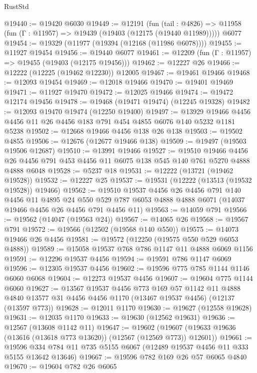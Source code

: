 \begin{lexlean}{RustStd}
\begin{coremodule}
@19440 := @19420 @6030
@19449 := @12191
    (fun (tail : @4826) => @11958 (fun (Γ : @11957) => @19439 (@19403 (@12175 (@19440 @11989)))))
    @6077
@19454 := @19329 (@11977 (@19394 (@12168 (@11986 @6078))))
@19455 := @11927 @19454
@19456 := @19440 @6077
@19461 := @12209 (fun (Γ : @11957) => @19455 (@19403 (@12175 @19456)))
@19462 := @12227 @26
@19466 := @12222 (@12225 (@19462 @12230)) @12005
@19467 := @19461 @19466
@19468 := @12093 @19454
@19469 := @12018 @19466
@19470 := @19401 @19469
@19471 := @11927 @19470
@19472 := @12025 @19466
@19474 := @19472 @12174 @19456
@19478 := @19468 (@19471 @19474) (@12245 @19328)
@19482 := @12093 @19470 @19474 (@12250 @19400)
@19497 := @13929 @19466 @4456 @4456 @11 @26 @4456 @183 @791 @454 @4855 @6076 @140 @5232 @1181 @5238
@19502 := @12668 @19466 @4456 @138 @26 @138
@19503 := @19502 @4855
@19506 := @12676 (@12677 @19466 @138)
@19509 := @19497 (@19503 @19506 @12687)
@19510 := @13991 @19466
@19527 := @19510
    @19466
    @4456
    @26
    @4456
    @791
    @453
    @4456
    @11
    @6075
    @138
    @545
    @140
    @761
    @5270
    @4888
    @4888
    @6048
@19528 := @5237 @18
@19531 := @12222 (@13721 (@19462 @19528))
@19532 := @12227 @25
@19537 := @19531 (@12222 (@13513 (@19532 @19528)) @19466)
@19562 := @19510
    @19537
    @4456
    @26
    @4456
    @791
    @140
    @4456
    @11
    @4895
    @24
    @550
    @529
    @787
    @6053
    @4888
    @4888
    @6071
    (@14037 @19466 @4456 @26 @4456 @791 @4456 @11)
@19563 := @14059 @791
@19566 := @19562 (@14047 (@19563 @24))
@19567 := @14065 @26
@19568 := @19567 @791
@19572 := @19566 (@12502 (@19568 @140 @550))
@19575 := @14073 @19466 @26 @4456
@19581 := @19572 (@12250 (@19575 @550 @529 @6053 @4888))
@19589 := @15058 @19537 @768 @786 @1147 @11 @4888 @6069 @1156
@19591 := @12296 @19537 @4456
@19594 := @19591 @786 @1147 @6069
@19596 := @12305 @19537 @4456
@19602 := @19596 @775 @785 @1144 @1146 @6060 @6068
@19604 := @12273 @19537 @4456
@19607 := @19604 @775 @1144 @6060
@19627 := @13567
    @19537
    @4456
    @773
    @169
    @57
    @1142
    @11
    @4888
    @4840
    @13577
    @31
    @4456
    @4456
    @1170
    (@13467 @19537 @4456)
    (@12137 (@13597 @773))
@19628 := @12011 @1170
@19630 := @19627 (@12558 @19628)
@19631 := @12035 @1170
@19633 := @19630 (@12562 @19631)
@19636 := @12567 (@13608 @1142 @11)
@19647 := @19602
    (@19607 (@19633 @19636 (@13616 (@13618 @773 @13620)) (@12567 (@12569 @773)) @12601))
@19661 := @19596 @334 @784 @11 @735 @5155 @6067 (@12489 @19537 @4456 @11 @333 @5155 @13642 @13646)
@19667 := @19596 @782 @169 @26 @57 @6065 @4840
@19670 := @19604 @782 @26 @6065

\end{coremodule}
\end{lexlean}
